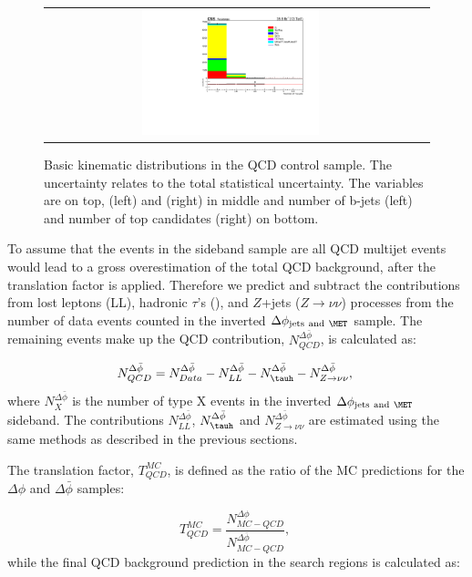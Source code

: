 \begin{figure}[hp]
\begin{center}
\begin{tabular}{cc}
\includegraphics[width=0.49\textwidth]{sections/mc4/Backgrounds/QCD/figures/84sb/_ntopjets_BasicCheck.pdf}
\end{tabular}
\end{center}
\caption{Basic kinematic distributions in the QCD control sample. The uncertainty relates to the total
statistical uncertainty. The variables are \MET on top, \MTTwo (left) and \HT (right) in middle
and number of b-jets (left) and number of top candidates (right) on bottom.}
\label{fig:BasicCheckQCD}
\end{figure}

To assume that the events in the sideband sample are all QCD multijet events 
would lead to a gross overestimation of the total QCD background, after the 
translation factor is applied. Therefore we predict and subtract the 
contributions from lost leptons (LL), hadronic $\tau$'s (\tauh), 
and $Z$+jets ($Z\rightarrow \nu\nu$) processes from the number of data 
events counted in the inverted $\Delta\phi_{\mathrm{jets~and}~\MET}$ sample.
The remaining events make up the QCD contribution, $N^{\Delta\bar{\phi}}_{QCD}$,
is calculated as:

\begin{equation}
N^{\Delta\bar{\phi}}_{QCD} = N^{\Delta\bar{\phi}}_{Data} - N^{\Delta\bar{\phi}}_{LL} - N^{\Delta\bar{\phi}}_{\tauh} - N^{\Delta\bar{\phi}}_{Z\rightarrow \nu\nu}, \;
\label{eq:Nqcd}
\end{equation}
where $N^{\Delta\bar{\phi}}_{X}$ is the number of type X events in the 
inverted $\Delta\phi_{\mathrm{jets~and}~ \MET}$ sideband. The contributions 
$N^{\Delta\bar{\phi}}_{LL}$, $N^{\Delta\bar{\phi}}_{\tauh}$ and 
$N^{\Delta\bar{\phi}}_{Z \rightarrow \nu\nu}$ are estimated using the same 
methods as described in the previous sections. 

The translation factor, $T_{QCD}^{MC}$, is defined as the ratio of the MC
predictions for the $\Delta\phi$ and $\Delta\bar{\phi}$ samples: 

\begin{equation}
T_{QCD}^{MC} = \frac{N^{\Delta\phi}_{MC-QCD}}{N^{\Delta\bar{\phi}}_{MC-QCD}}, \;
\label{eq:TqcdMC}
\end{equation}
while the final QCD background prediction in the search regions is calculated as:

